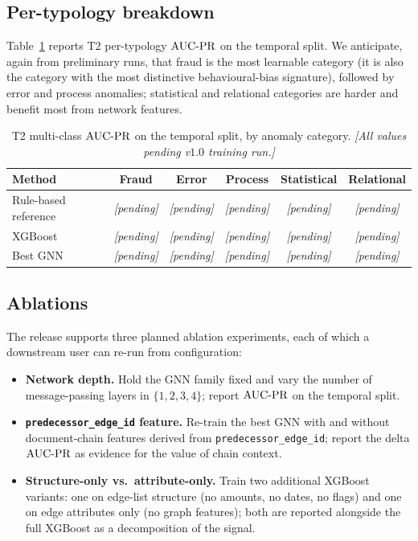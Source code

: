 \subsection{Per-typology breakdown}
\label{sec:evaluation:typology}

Table~\ref{tab:eval:typology} reports T2 per-typology $\operatorname{AUC\text{-}PR}$ on
the temporal split.  We anticipate, again from preliminary runs,
that fraud is the most learnable category (it is also the
category with the most distinctive behavioural-bias signature),
followed by error and process anomalies; statistical and
relational categories are harder and benefit most from network
features.

\begin{table}[H]
  \centering
  \caption{T2 multi-class $\operatorname{AUC\text{-}PR}$ on the temporal split, by
    anomaly category.  \textit{[All values pending v$1.0$ training
    run.]}}
  \label{tab:eval:typology}
  \small
  \begin{tabular}{lccccc}
    \toprule
    \textbf{Method} & \textbf{Fraud} & \textbf{Error} &
      \textbf{Process} & \textbf{Statistical} & \textbf{Relational}\\
    \midrule
    Rule-based reference & \textit{[pending]} & \textit{[pending]} & \textit{[pending]} & \textit{[pending]} & \textit{[pending]}\\
    XGBoost              & \textit{[pending]} & \textit{[pending]} & \textit{[pending]} & \textit{[pending]} & \textit{[pending]}\\
    Best GNN             & \textit{[pending]} & \textit{[pending]} & \textit{[pending]} & \textit{[pending]} & \textit{[pending]}\\
    \bottomrule
  \end{tabular}
\end{table}

\subsection{Ablations}
\label{sec:evaluation:ablations}

The release supports three planned ablation experiments, each of
which a downstream user can re-run from configuration:

\begin{itemize}
  \item \textbf{Network depth.}  Hold the GNN family fixed and
    vary the number of message-passing layers in
    $\{1, 2, 3, 4\}$; report $\operatorname{AUC\text{-}PR}$ on the temporal split.
  \item \textbf{\texttt{predecessor\_edge\_id} feature.}  Re-train
    the best GNN with and without document-chain features
    derived from \texttt{predecessor\_edge\_id}; report the
    delta $\operatorname{AUC\text{-}PR}$ as evidence for the value of chain context.
  \item \textbf{Structure-only vs.\ attribute-only.}  Train two
    additional XGBoost variants: one on edge-list structure
    (no amounts, no dates, no flags) and one on edge attributes
    only (no graph features); both are reported alongside the
    full XGBoost as a decomposition of the signal.
\end{itemize}

